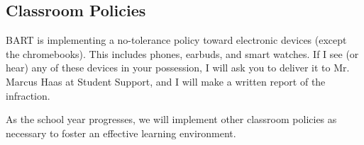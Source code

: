 \documentclass[12pt]{article}
\begin{document}
\subsection*{Classroom Policies}

BART is implementing a no-tolerance policy toward electronic devices (except the chromebooks). This includes phones, earbuds, and smart watches. If I see (or hear) any of these devices in your possession, I will ask you to deliver it to Mr. Marcus Haas at Student Support, and I will make a written report of the infraction.

As the school year progresses, we will implement other classroom policies as necessary to foster an effective learning environment.
\end{document}
